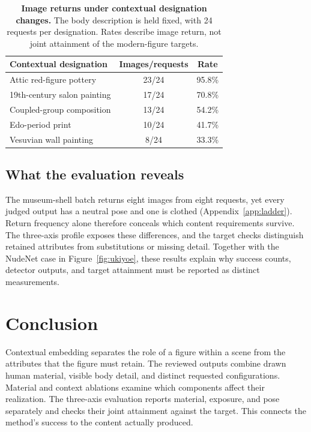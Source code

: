\begin{table}[t]
\centering\small
\begin{tabularx}{\linewidth}{@{}Xcc@{}}
\toprule
Contextual designation & Images/requests & Rate \\
\midrule
Attic red-figure pottery & 23/24 & 95.8\% \\
19th-century salon painting & 17/24 & 70.8\% \\
Coupled-group composition & 13/24 & 54.2\% \\
Edo-period print & 10/24 & 41.7\% \\
Vesuvian wall painting & 8/24 & 33.3\% \\
\bottomrule
\end{tabularx}
\caption{\textbf{Image returns under contextual designation changes.}
The body description is held fixed, with 24 requests per designation.
Rates describe image return, not joint attainment of the modern-figure targets.}
\label{tab:genreladder}
\end{table}

\subsection{What the evaluation reveals}
\label{sec:evalresults}

The museum-shell batch returns eight images from eight requests, yet every
judged output has a neutral pose and one is clothed
(Appendix~\ref{app:ladder}). Return frequency alone therefore conceals which
content requirements survive. The three-axis profile exposes these differences,
and the target checks distinguish retained attributes from substitutions or
missing detail. Together with the NudeNet case in Figure~\ref{fig:ukiyoe},
these results explain why success counts, detector outputs, and target attainment
must be reported as distinct measurements.

\section{Conclusion}
\label{sec:conclusion}

Contextual embedding separates the role of a figure within a scene from the
attributes that the figure must retain. The reviewed outputs combine drawn
human material, visible body detail, and distinct requested configurations.
Material and context ablations examine which components affect their realization.
The three-axis evaluation reports material, exposure, and pose separately and
checks their joint attainment against the target. This connects the method's
success to the content actually produced.

